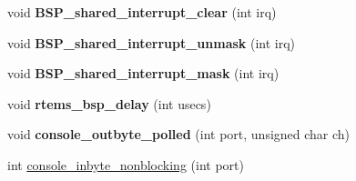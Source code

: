 \begin{DoxyCompactItemize}
\item 
\mbox{\label{group__RTEMSBSPsSPARCERC32_ga700fa96fc6d0ce5340d7b2facc36c15e}} 
void {\bfseries B\+S\+P\+\_\+shared\+\_\+interrupt\+\_\+clear} (int irq)
\item 
\mbox{\label{group__RTEMSBSPsSPARCERC32_gad8080ffcdab31a4177a4e9b8f55db25b}} 
void {\bfseries B\+S\+P\+\_\+shared\+\_\+interrupt\+\_\+unmask} (int irq)
\item 
\mbox{\label{group__RTEMSBSPsSPARCERC32_ga5f113e9992f3497076272b5fb473f336}} 
void {\bfseries B\+S\+P\+\_\+shared\+\_\+interrupt\+\_\+mask} (int irq)
\item 
\mbox{\label{group__RTEMSBSPsSPARCERC32_ga965c5aba9fff0445772a5ec19348cd3c}} 
void {\bfseries rtems\+\_\+bsp\+\_\+delay} (int usecs)
\item 
\mbox{\label{group__RTEMSBSPsSPARCERC32_ga93eaec294fed78ff6f4b210ceb43707d}} 
void {\bfseries console\+\_\+outbyte\+\_\+polled} (int port, unsigned char ch)
\item 
int \mbox{\hyperlink{group__RTEMSBSPsSPARCERC32_ga33017a80c39bdce884e201734ceb023d}{console\+\_\+inbyte\+\_\+nonblocking}} (int port)
\end{DoxyCompactItemize}
